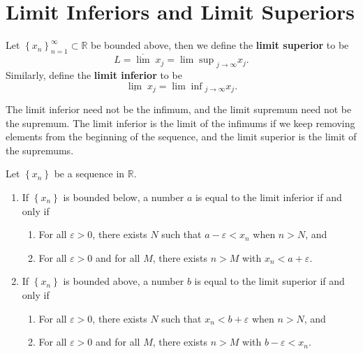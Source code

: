 \documentclass[twoside,10pt]{report}
\begin{document}

\section{Limit Inferiors and Limit Superiors}
\begin{defn}[]
Let $\left\{ x_n \right\}_{n=1}^\infty \subset \mathbb{R}$ be bounded above, then we define the \textbf{limit superior} to be
\[
	L = \overline{\lim} \;x_j = {\lim\sup}_{j\to\infty}x_j.
\] Similarly, define the \textbf{limit inferior} to be
\[
	\underline{\lim} \;x_j = {\lim\inf}_{j\to\infty} x_j.
\] 
\end{defn}

The limit inferior need not be the infimum, and the limit supremum need not be the supremum. The limit inferior is the limit of the infimums if we keep removing elements from the beginning of the sequence, and the limit superior is the limit of the supremums.

\begin{prop}
	Let $\left\{ x_n \right\}$ be a sequence in $\mathbb{R}$.
	\begin{enumerate}
		\item If $\left\{ x_n \right\}$ is bounded below, a number $a$ is equal to the limit inferior if and only if
			\begin{enumerate}
				\item For all $\varepsilon>0$, there exists $N$ such that $a-\varepsilon<x_n$ when $n>N$, and
				\item For all $\varepsilon>0$ and for all $M$, there exists $n > M$ with $x_n < a + \varepsilon$.
			\end{enumerate}

		\item If $\left\{ x_n \right\}$ is bounded above, a number $b$ is equal to the limit superior if and only if
			\begin{enumerate}
				\item For all $\varepsilon>0$, there exists $N$ such that $x_n < b + \varepsilon$ when $n >N$, and
				\item For all $\varepsilon>0$ and for all $M$, there exists $n > M$ with $b-\varepsilon< x_n$.
			\end{enumerate}
	\end{enumerate}
\end{prop}

\end{document}
